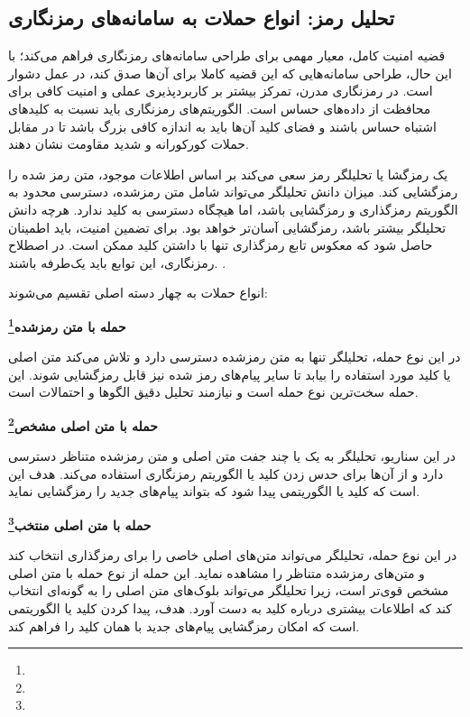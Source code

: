 \subsection{تحلیل رمز: انواع حملات به سامانه‌های رمزنگاری}

قضیه امنیت کامل، معیار مهمی برای طراحی سامانه‌های رمزنگاری فراهم می‌کند؛ با این حال، طراحی سامانه‌هایی که این قضیه کاملا برای آن‌ها صدق کند، در عمل دشوار است. در رمزنگاری مدرن، تمرکز بیشتر بر کاربردپذیری عملی و امنیت کافی برای محافظت از داده‌های حساس است. الگوریتم‌های رمزنگاری باید نسبت به کلیدهای اشتباه حساس باشند و فضای کلید آن‌ها باید به اندازه کافی بزرگ باشد تا در مقابل حملات کورکورانه و شدید مقاومت نشان دهند\cite{ref32}.

یک رمزگشا یا تحلیلگر رمز سعی می‌کند بر اساس اطلاعات موجود، متن رمز شده را رمزگشایی کند. میزان دانش تحلیلگر می‌تواند شامل متن رمزشده، دسترسی محدود به الگوریتم رمزگذاری و رمزگشایی باشد، اما هیچگاه دسترسی به کلید ندارد. هرچه دانش تحلیلگر بیشتر باشد، رمزگشایی آسان‌تر خواهد بود. برای تضمین امنیت، باید اطمینان حاصل شود که معکوس تابع رمزگذاری تنها با داشتن کلید ممکن است. در اصطلاح رمزنگاری، این توابع باید یک‌طرفه باشند. \cite{ref33}.

انواع حملات به چهار دسته اصلی تقسیم می‌شوند\cite{ref34}:

\textbf{حمله با متن رمزشده\footnote{}}

در این نوع حمله، تحلیلگر تنها به متن رمزشده دسترسی دارد و تلاش می‌کند متن اصلی یا کلید مورد استفاده را بیابد تا سایر پیام‌های رمز شده نیز قابل رمزگشایی شوند. این حمله سخت‌ترین نوع حمله است و نیازمند تحلیل دقیق الگوها و احتمالات است.

\textbf{حمله با متن اصلی مشخص\footnote{}}

در این سناریو، تحلیلگر به یک یا چند جفت متن اصلی و متن رمزشده متناظر دسترسی دارد و از آن‌ها برای حدس زدن کلید یا الگوریتم رمزنگاری استفاده می‌کند. هدف این است که کلید  یا الگوریتمی پیدا شود که بتواند پیام‌های جدید را رمزگشایی نماید.

\textbf{حمله با متن اصلی منتخب\footnote{}}

در این نوع حمله، تحلیلگر می‌تواند متن‌های اصلی خاصی را برای رمزگذاری انتخاب کند و متن‌های رمزشده متناظر را مشاهده نماید. این حمله از نوع حمله با متن اصلی مشخص قوی‌تر است، زیرا تحلیلگر می‌تواند بلوک‌های متن اصلی را به گونه‌ای انتخاب کند که اطلاعات بیشتری درباره کلید به دست آورد. هدف، پیدا کردن کلید  یا الگوریتمی است که امکان رمزگشایی پیام‌های جدید با همان کلید را فراهم کند.

